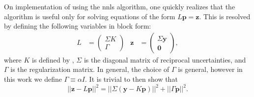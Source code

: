 On implementation of  using the \gls{nnls} algorithm, one quickly realizes that the algorithm is useful only for solving equations of the form $L\mathbf{p} = \mathbf{z}$. This is resolved by defining the following variables in block form: 
%
\begin{align}
    L &= 
    \left(\begin{array}{c}
        \Sigma K \\ \Gamma
    \end{array}\right) &
    \mathbf{z} &= \left(\begin{array}{c}
        \Sigma\mathbf{y} \\ \bm{0}
    \end{array}\right),
\end{align}
%
where $K$ is defined by , $\Sigma$ is the diagonal matrix of reciprocal uncertainties, and $\Gamma$ is the regularization matrix. In general, the choice of $\Gamma$ is general, however in this work we define $\Gamma \equiv \alpha I$. It is trivial to then show that 
%
\begin{equation}
||\mathbf{z}-L\mathbf{p}||^2 = ||\Sigma (\mathbf{y} - K\mathbf{p})||^2 + ||\Gamma\mathbf{p}||^2.
\end{equation}
%
